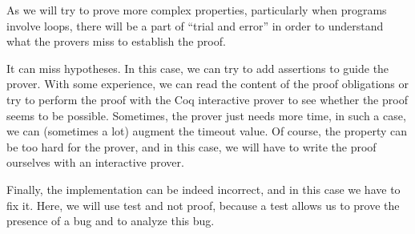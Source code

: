 


As we will try to prove more complex properties, particularly when
programs involve loops, there will be a part of ``trial and error'' in
order to understand what the provers miss to establish the proof.

It can miss hypotheses. In this case, we can try to add assertions to
guide the prover. With some experience, we can read the content of the
proof obligations or try to perform the proof with the Coq interactive
prover to see whether the proof seems to be possible. Sometimes, the
prover just needs more time, in such a case, we can (sometimes a lot)
augment the timeout value. Of course, the property can be too hard for
the prover, and in this case, we will have to write the proof ourselves
with an interactive prover.

Finally, the implementation can be indeed incorrect, and in this case we
have to fix it. Here, we will use test and not proof, because a test
allows us to prove the presence of a bug and to analyze this bug.
